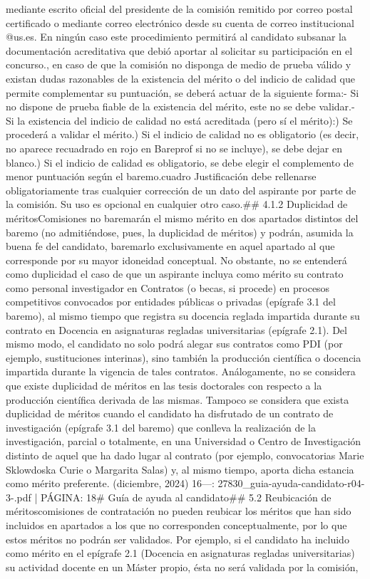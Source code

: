 \documentclass{article}
\begin{document}
\begin{itemize}
{{{{{{mediante escrito oficial del presidente de la comisión remitido por correo postal certificado o mediante correo electrónico desde su cuenta de correo institucional @us.es. En ningún caso este procedimiento permitirá al candidato subsanar la documentación acreditativa que debió aportar al solicitar su participación en el concurso.\n\nFinalmente, en caso de que la comisión no disponga de medio de prueba válido y existan dudas razonables de la existencia del mérito o del indicio de calidad que permite complementar su puntuación, se deberá actuar de la siguiente forma:\n- Si no dispone de prueba fiable de la existencia del mérito, este no se debe validar.\n- Si la existencia del indicio de calidad no está acreditada (pero sí el mérito):\na) Se procederá a validar el mérito.\nb) Si el indicio de calidad no es obligatorio (es decir, no aparece recuadrado en rojo en Bareprof si no se incluye), se debe dejar en blanco.\nc) Si el indicio de calidad es obligatorio, se debe elegir el complemento de menor puntuación según el baremo.\n\nEl cuadro Justificación debe rellenarse obligatoriamente tras cualquier corrección de un dato del aspirante por parte de la comisión. Su uso es opcional en cualquier otro caso.\n\n## 4.1.2 Duplicidad de méritos\n\nLas Comisiones no baremarán el mismo mérito en dos apartados distintos del baremo (no admitiéndose, pues, la duplicidad de méritos) y podrán, asumida la buena fe del candidato, baremarlo exclusivamente en aquel apartado al que corresponde por su mayor idoneidad conceptual. No obstante, no se entenderá como duplicidad el caso de que un aspirante incluya como mérito su contrato como personal investigador en Contratos (o becas, si procede) en procesos competitivos convocados por entidades públicas o privadas (epígrafe 3.1 del baremo), al mismo tiempo que registra su docencia reglada impartida durante su contrato en Docencia en asignaturas regladas universitarias (epígrafe 2.1). Del mismo modo, el candidato no solo podrá alegar sus contratos como PDI (por ejemplo, sustituciones interinas), sino también la producción científica o docencia impartida durante la vigencia de tales contratos. Análogamente, no se considera que existe duplicidad de méritos en las tesis doctorales con respecto a la producción científica derivada de las mismas. Tampoco se considera que exista duplicidad de méritos cuando el candidato ha disfrutado de un contrato de investigación (epígrafe 3.1 del baremo) que conlleva la realización de la investigación, parcial o totalmente, en una Universidad o Centro de Investigación distinto de aquel que ha dado lugar al contrato (por ejemplo, convocatorias Marie Sklowdoska Curie o Margarita Salas) y, al mismo tiempo, aporta dicha estancia como mérito preferente.\n{} (diciembre, 2024) 16\n\n---\n\nFUENTE: 27830_guia-ayuda-candidato-r04-3-.pdf | PÁGINA: 18\n# Guía de ayuda al candidato\n\n## 5.2 Reubicación de méritos\n\nLas comisiones de contratación no pueden reubicar los méritos que han sido incluidos en apartados a los que no corresponden conceptualmente, por lo que estos méritos no podrán ser validados. Por ejemplo, si el candidato ha incluido como mérito en el epígrafe 2.1 (Docencia en asignaturas regladas universitarias) su actividad docente en un Máster propio, ésta no será validada por la comisión, }}}}}}
\end{itemize}
\end{document}
